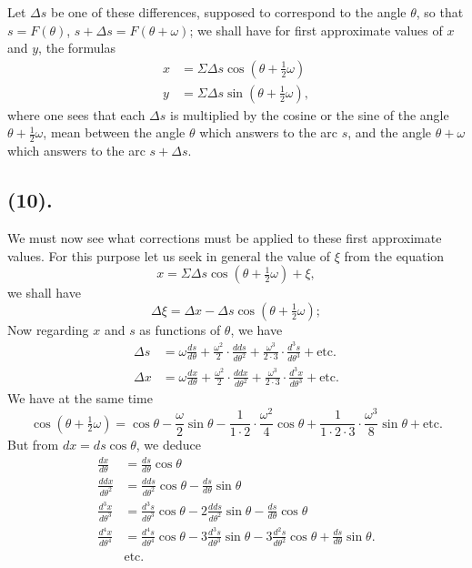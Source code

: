 \documentclass{article}
\begin{document}
Let $\Delta s$ be one of these differences, supposed to correspond to the angle $\theta$, so that $s=F(\theta)$, $s+\Delta s=F(\theta+\omega)$; we shall have for first approximate values of $x$ and $y$, the formulas
\[ \begin{aligned} x&=\Sigma\Delta s\cos(\theta+\tfrac{1}{2}\omega)\\ y&=\Sigma\Delta s\sin(\theta+\tfrac{1}{2}\omega), \end{aligned} \]
where one sees that each $\Delta s$ is multiplied by the cosine or the sine of the angle $\theta+\frac{1}{2}\omega$, mean between the angle $\theta$ which answers to the arc $s$, and the angle $\theta+\omega$ which answers to the arc $s+\Delta s$.

\subsection*{(10).}

We must now see what corrections must be applied to these first approximate values. For this purpose let us seek in general the value of $\xi$ from the equation
\[ x=\Sigma\Delta s\cos(\theta+\tfrac{1}{2}\omega)+\xi, \]
we shall have
\[ \Delta\xi=\Delta x-\Delta s\cos(\theta+\tfrac{1}{2}\omega); \]
Now regarding $x$ and $s$ as functions of $\theta$, we have
\[ \begin{aligned} \Delta s&=\omega\frac{ds}{d\theta}+\frac{\omega^{2}}{2}\cdot\frac{dds}{d\theta^{2}}+\frac{\omega^{3}}{2\cdot3}\cdot\frac{d^{3}s}{d\theta^{3}}+\text{etc.}\\ \Delta x&=\omega\frac{dx}{d\theta}+\frac{\omega^{2}}{2}\cdot\frac{ddx}{d\theta^{2}}+\frac{\omega^{3}}{2\cdot3}\cdot\frac{d^{3}x}{d\theta^{3}}+\text{etc.} \end{aligned} \]
We have at the same time
\[ \cos(\theta+\tfrac{1}{2}\omega)=\cos\theta-\frac{\omega}{2}\sin\theta-\frac{1}{1\cdot2}\cdot\frac{\omega^{2}}{4}\cos\theta+\frac{1}{1\cdot2\cdot3}\cdot\frac{\omega^{3}}{8}\sin\theta+\text{etc.} \]
But from $dx=ds\cos\theta$, we deduce
\[ \begin{aligned} \frac{dx}{d\theta}&=\frac{ds}{d\theta}\cos\theta\\ \frac{ddx}{d\theta^{2}}&=\frac{dds}{d\theta^{2}}\cos\theta-\frac{ds}{d\theta}\sin\theta\\ \frac{d^{3}x}{d\theta^{3}}&=\frac{d^{3}s}{d\theta^{3}}\cos\theta-2\frac{dds}{d\theta^{2}}\sin\theta-\frac{ds}{d\theta}\cos\theta\\ \frac{d^{4}x}{d\theta^{4}}&=\frac{d^{4}s}{d\theta^{4}}\cos\theta-3\frac{d^{3}s}{d\theta^{3}}\sin\theta-3\frac{d^{2}s}{d\theta^{2}}\cos\theta+\frac{ds}{d\theta}\sin\theta.\\ &\text{etc.} \end{aligned} \]
\end{document}
